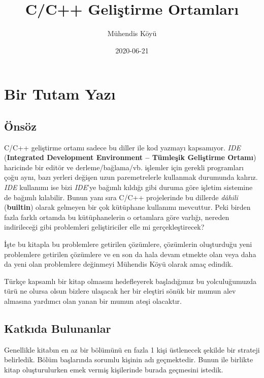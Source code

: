 \documentclass[
]{book}
\title{C/C++ Geliştirme Ortamları}
\author{Mühendis Köyü}
\date{2020-06-21}
\begin{document}
\maketitle

{
\setcounter{tocdepth}{1}
\tableofcontents
}
\hypertarget{bir-tutam-yazux131}{%
\chapter*{Bir Tutam Yazı}\label{bir-tutam-yazux131}}

\hypertarget{uxf6nsuxf6z}{%
\section*{Önsöz}\label{uxf6nsuxf6z}}

C/C++ geliştirme ortamı sadece bu diller ile kod yazmayı kapsamıyor. \emph{IDE} (\textbf{Integrated Development Environment -- Tümleşik Geliştirme Ortamı}) haricinde bir editör ve derleme/bağlama/vb. işlemler için gerekli programları çoğu aynı, bazı yerleri değişen uzun paremetrelerle kullanmak durumunda kalırız. \emph{IDE} kullanımı ise bizi \emph{IDE}'ye bağımlı kıldığı gibi duruma göre işletim sistemine de bağımlı kılabilir. Bunun yanı sıra C/C++ projelerinde bu dillerde \emph{dâhili} (\textbf{builtin}) olarak gelmeyen bir çok kütüphane kullanımı mevcuttur. Peki birden fazla farklı ortamda bu kütüphanelerin o ortamlara göre varlığı, nereden indirileceği gibi problemleri geliştiriciler elle mi gerçekleştirecek?

İşte bu kitapla bu problemlere getirilen çözümlere, çözümlerin oluşturduğu yeni problemlere getirilen çözümlere ve en son da hala devam etmekte olan veya daha da yeni olan problemlere değinmeyi Mühendis Köyü olarak amaç edindik.

Türkçe kapsamlı bir kitap olmasını hedefleyerek başladığımız bu yolculuğumuzda türü ne olursa olsun bizlere ulaşacak her bir eleştiri sönük bir mumun alev almasına yardımcı olan yanan bir mumun ateşi olacaktır.

\hypertarget{katkux131da-bulunanlar}{%
\section*{Katkıda Bulunanlar}\label{katkux131da-bulunanlar}}

Genellikle kitabın en az bir bölümünü en fazla 1 kişi üstlenecek şekilde bir strateji belirledik. Bölüm başlarında sorumlu kişinin adı geçmektedir. Bunun ile birlikte kitap oluşturulurken emek vermiş kişilerinde burada geçmesini istedik.
\end{document}
